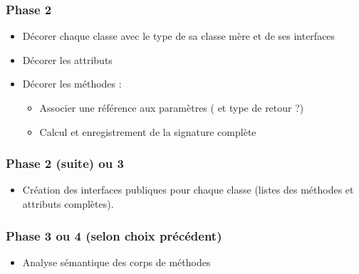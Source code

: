 \documentclass{../../res/univ-projet}
\begin{document}
  \subsubsection{Phase 2}
  \begin{itemize}
    \item Décorer chaque classe avec le type de sa classe mère et de ses interfaces
    \item Décorer les attributs
    \item Décorer les méthodes :
      \begin{itemize}
        \item Associer une référence aux paramètres ( et type de retour ?)
        \item Calcul et enregistrement de la signature complète
      \end{itemize}
    
  \end{itemize}
  \subsubsection{Phase 2 (suite) ou 3}
  \begin{itemize}
    \item Création des interfaces publiques pour chaque classe (listes des méthodes et attributs
  complètes).
  \end{itemize}
  \subsubsection{Phase 3 ou 4 (selon choix précédent)}
  \begin{itemize}
    \item Analyse sémantique des corps de méthodes
  \end{itemize}

 
\end{document}
